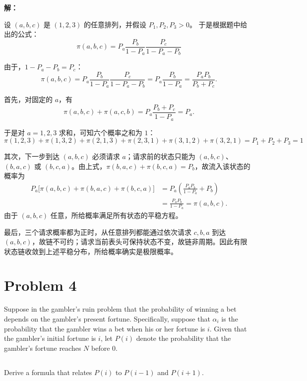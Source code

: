 \documentclass[12pt,a4paper]{article}
\begin{document}
\begin{answerbox}
\textbf{解：}

设 $(a,b,c)$ 是 $(1,2,3)$ 的任意排列，并假设 $P_1,P_2,P_3>0$。
于是根据题中给出的公式：
\[
\pi(a,b,c)=P_a\frac{P_b}{1-P_a}\frac{P_c}{1-P_a-P_b}
\]

由于，$1-P_a-P_b=P_c$：
\[
\pi(a,b,c)=P_a\frac{P_b}{1-P_a}\frac{P_c}{1-P_a-P_b}=P_a\frac{P_b}{1-P_a}=\frac{P_aP_b}{P_b+P_c}.
\]

首先，对固定的 $a$，有
\[
\pi(a,b,c)+\pi(a,c,b)
=P_a\frac{P_b+P_c}{1-P_a}=P_a.
\]

于是对 $a=1,2,3$ 求和，可知六个概率之和为 $1$：
$$
\pi(1, 2, 3) + \pi(1, 3, 2) + \pi(2, 1, 3) + \pi(2, 3, 1) + \pi(3, 1, 2) +\pi(3, 2,1)=P_1+P_2+P_3=1
$$

其次，下一步到达 $(a,b,c)$ 必须请求 $a$；请求前的状态只能为 $(a,b,c)$、$(b,a,c)$ 或 $(b,c,a)$。由上式，$\pi(b,a,c)+\pi(b,c,a)=P_b$，故流入该状态的概率为
\[
\begin{aligned}
P_a\bigl[\pi(a,b,c)+\pi(b,a,c)+\pi(b,c,a)\bigr]
&=P_a\left(\frac{P_aP_b}{1-P_a}+P_b\right)\\
&=\frac{P_aP_b}{1-P_a}=\pi(a,b,c).
\end{aligned}
\]
由于 $(a,b,c)$ 任意，所给概率满足所有状态的平稳方程。

最后，三个请求概率都为正时，从任意排列都能通过依次请求 $c,b,a$ 到达 $(a,b,c)$，故链不可约；请求当前表头可保持状态不变，故链非周期。因此有限状态链收敛到上述平稳分布，所给概率确实是极限概率。
\end{answerbox}


\section{Problem 4}
Suppose in the gambler's ruin problem that the probability of winning a bet depends on the gambler's present fortune. Specifically, suppose that $\alpha_i$ is the probability that the gambler wins a bet when his or her fortune is $i$. Given that the gambler's initial fortune is $i$, let $P(i)$ denote the probability that the gambler's fortune reaches $N$ before $0$.


\subsection{}

 Derive a formula that relates $P(i)$ to $P(i-1)$ and $P(i+1)$.
\end{document}
